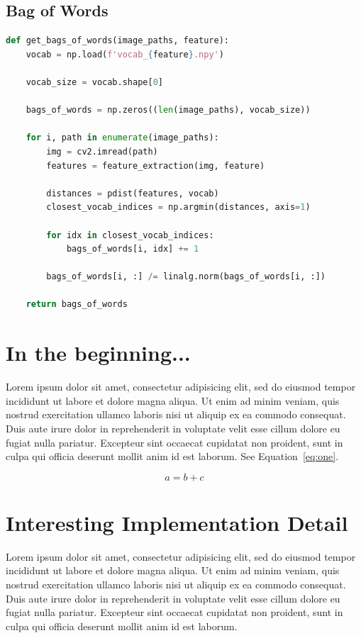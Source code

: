 \subsection*{Bag of Words}
\begin{lstlisting}[language=python]
def get_bags_of_words(image_paths, feature):
    vocab = np.load(f'vocab_{feature}.npy')

    vocab_size = vocab.shape[0]

    bags_of_words = np.zeros((len(image_paths), vocab_size))

    for i, path in enumerate(image_paths):
        img = cv2.imread(path)
        features = feature_extraction(img, feature)

        distances = pdist(features, vocab)
        closest_vocab_indices = np.argmin(distances, axis=1)

        for idx in closest_vocab_indices:
            bags_of_words[i, idx] += 1

        bags_of_words[i, :] /= linalg.norm(bags_of_words[i, :])

    return bags_of_words
\end{lstlisting}
\section*{In the beginning...}

Lorem ipsum dolor sit amet, consectetur adipisicing elit, sed do eiusmod tempor incididunt ut labore et dolore magna aliqua. Ut enim ad minim veniam, quis nostrud exercitation ullamco laboris nisi ut aliquip ex ea commodo consequat. Duis aute irure dolor in reprehenderit in voluptate velit esse cillum dolore eu fugiat nulla pariatur. Excepteur sint occaecat cupidatat non proident, sunt in culpa qui officia deserunt mollit anim id est laborum. See Equation~\ref{eq:one}.

\begin{equation}
a = b + c
\label{eq:one}
\end{equation}

\section*{Interesting Implementation Detail}

Lorem ipsum dolor sit amet, consectetur adipisicing elit, sed do eiusmod tempor incididunt ut labore et dolore magna aliqua. Ut enim ad minim veniam, quis nostrud exercitation ullamco laboris nisi ut aliquip ex ea commodo consequat. Duis aute irure dolor in reprehenderit in voluptate velit esse cillum dolore eu fugiat nulla pariatur. Excepteur sint occaecat cupidatat non proident, sunt in culpa qui officia deserunt mollit anim id est laborum.

